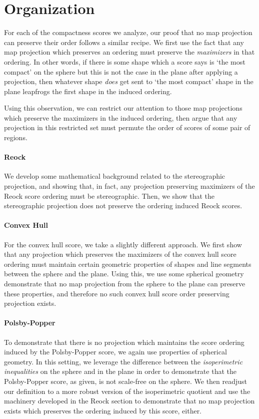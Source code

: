 \section{Organization}


For each of the compactness scores we analyze, our proof that no map
projection can preserve their order follows a similar recipe. We
first use the fact that any map projection which preserves an ordering
must preserve the \textit{maximizers} in that ordering.  In other words,
if there is some shape which a score says is `the most compact' on the sphere 
but this is not the case in the plane after applying a projection, then whatever 
shape \textit{does} get sent to `the most compact' shape in the plane leapfrogs 
the first shape in the induced ordering.

Using this observation, we can restrict our attention to those map
projections which preserve the maximizers in the induced ordering,
then argue that any projection in this restricted set must permute the
order of scores of some pair of regions.

\paragraph{Reock}
We  develop some mathematical background related to 
the   stereographic projection, and showing 
that, in fact, any projection preserving maximizers 
 of the Reock score ordering must be stereographic. 
Then, we show that the  stereographic 
projection does not preserve the ordering induced Reock scores. 


\paragraph{Convex Hull}
For the convex hull score, we take a slightly different approach.  We first 
show that any projection which preserves the maximizers of the convex hull score 
ordering must maintain certain geometric properties of shapes and line segments 
between the sphere and the plane.  Using this, we use some spherical geometry demonstrate that no 
map projection from the sphere to the plane can preserve these properties, and therefore 
no such convex hull score order preserving projection exists.


\paragraph{Polsby-Popper}
To demonstrate that there is no projection which maintains the score ordering induced by the Polsby-Popper score, we again use properties of spherical geometry.  In this setting, we leverage the 
difference between the \textit{isoperimetric inequalities} on the sphere and in the plane in order to 
demonstrate that the Polsby-Popper score, as given, is not scale-free on the sphere.  We then readjust 
our definition to a more robust version of the isoperimetric quotient and use the machinery developed 
in the Reock section to demonstrate that no map projection exists which preserves the ordering induced by this score, either.


